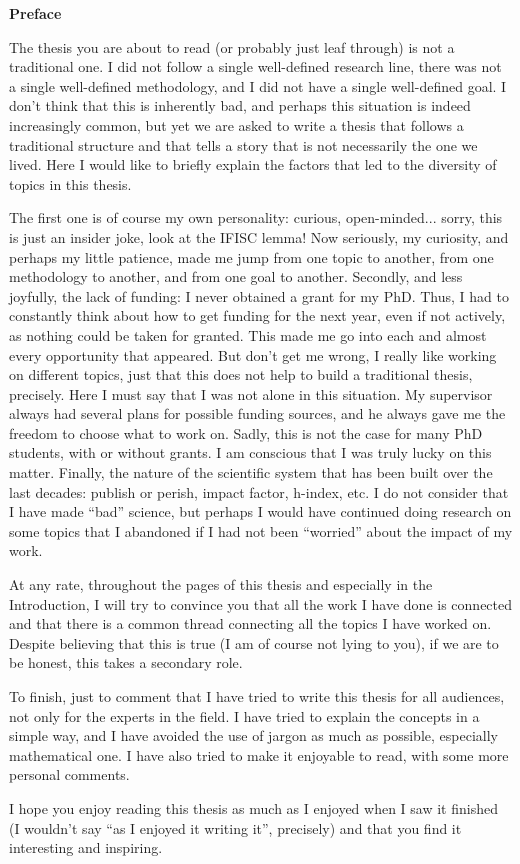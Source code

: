 \begin{center}
    \textbf{\Large Preface}
\end{center}

The thesis you are about to read (or probably just leaf through) is not a
traditional one. I did not follow a single well-defined research line, there
was not a single well-defined methodology, and I did not have a single
well-defined goal. I don't think that this is inherently bad, and perhaps this
situation is indeed increasingly common, but yet we are asked to write a thesis
that follows a traditional structure and that tells a story that is not
necessarily the one we lived. Here I would like to briefly explain the factors
that led to the diversity of topics in this thesis.

The first one is of course my own personality: curious, open-minded... sorry,
this is just an insider joke, look at the IFISC lemma! Now seriously, my
curiosity, and perhaps my little patience, made me jump from one topic to
another, from one methodology to another, and from one goal to another.
Secondly, and less joyfully, the lack of funding: I never obtained a grant for
my PhD. Thus, I had to constantly think about how to get funding for
the next year, even if not actively, as nothing could be taken for granted.
This made me go into each and almost every opportunity that appeared. But don't
get me wrong, I really like working on different topics, just that this does
not help to build a traditional thesis, precisely. Here I must say that I was
not alone in this situation. My supervisor always had several plans for
possible funding sources, and he always gave me the freedom to choose what to
work on. Sadly, this is not the case for many PhD students, with or without
grants. I am conscious that I was truly lucky on this matter. Finally, the
nature of the scientific system that has been built over the last decades:
publish or perish, impact factor, h-index, etc. I do not consider that I
have made ``bad'' science, but perhaps I would have continued doing research on
some topics that I abandoned if I had not been ``worried'' about the impact of
my work.

At any rate, throughout the pages of this thesis and especially in the
Introduction, I will try to convince you that all the work I have done is
connected and that there is a common thread connecting all the topics I have
worked on. Despite believing that this is true (I am of course not lying to
you), if we are to be honest, this takes a secondary role.

To finish, just to comment that I have tried to write this thesis for all
audiences, not only for the experts in the field. I have tried to explain the
concepts in a simple way, and I have avoided the use of jargon as much as
possible, especially mathematical one. I have also tried to make it enjoyable
to read, with some more personal comments.

I hope you enjoy reading this thesis as much as I enjoyed when I saw it
finished (I wouldn't say ``as I enjoyed it writing it'', precisely) and that
you find it interesting and inspiring.

\vfill